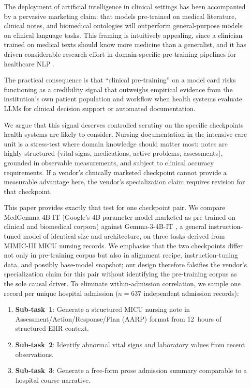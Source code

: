 \documentclass[sigconf,anonymous=false,review=false]{acmart}
\newcommand{\medgemma}{MedGemma-4B-IT\xspace}
\newcommand{\gemma}{Gemma-3-4B-IT\xspace}
\begin{document}
The deployment of artificial intelligence in clinical settings has been
accompanied by a pervasive marketing claim: that models pre-trained on medical
literature, clinical notes, and biomedical ontologies will outperform
general-purpose models on clinical language tasks. This framing is intuitively
appealing, since a clinician trained on medical texts should know more
medicine than a generalist, and it has driven considerable research effort in
domain-specific pre-training pipelines for healthcare NLP
\cite{lee2020biobert,singhal2023large}.

The practical consequence is that ``clinical pre-training'' on a model card
risks functioning as a credibility signal that outweighs empirical evidence
from the institution's own patient population and workflow when health systems
evaluate LLMs for clinical decision support or automated documentation.

We argue that this signal deserves controlled scrutiny on the specific
checkpoints health systems are likely to consider. Nursing documentation in
the intensive care unit is a stress-test where domain knowledge should matter
most: notes are highly structured (vital signs, medications, active problems,
assessments), grounded in observable measurements, and subject to clinical
accuracy requirements. If a vendor's clinically marketed checkpoint cannot
provide a measurable advantage here, the vendor's specialization claim
requires revision for that checkpoint.

This paper provides exactly that test for one checkpoint pair. We compare
\medgemma \cite{medgemma2025} (Google's 4B-parameter model marketed as
pre-trained on clinical and biomedical corpora) against \gemma
\cite{gemmateam2025gemma3}, a general instruction-tuned model of identical
size and architecture, on three tasks derived from MIMIC-III
\cite{johnson2016mimic} MICU nursing records. We emphasise that the two
checkpoints differ not only in pre-training corpus but also in alignment
recipe, instruction-tuning data, and possibly base-model snapshot; our design
therefore falsifies the vendor's specialization claim for this pair without
identifying the pre-training corpus as the sole causal driver. To eliminate
within-admission correlation, we sample one record per unique hospital
admission ($n = 637$ independent admission records):

\begin{enumerate}
  \item \textbf{Sub-task~1}: Generate a structured MICU nursing note in
    Assessment/Action/Response/Plan (AARP) format from 12~hours of structured
    EHR context.
  \item \textbf{Sub-task~2}: Identify abnormal vital signs and laboratory
    values from recent observations.
  \item \textbf{Sub-task~3}: Generate a free-form prose admission summary
    comparable to a hospital course narrative.
\end{enumerate}
\end{document}
